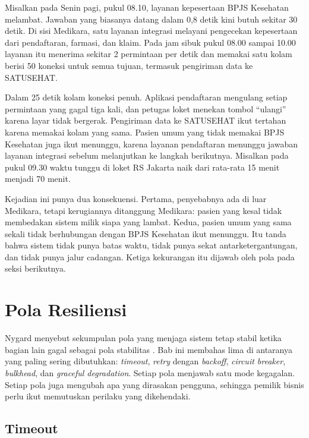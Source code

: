 \begin{kasus}[title={Kasus Medikara Health: Gangguan BPJS Kesehatan Merambat ke Loket}]
  Misalkan pada Senin pagi, pukul 08.10, layanan kepesertaan BPJS Kesehatan melambat. Jawaban yang
  biasanya datang dalam 0,8 detik kini butuh sekitar 30 detik. Di sisi Medikara, satu layanan
  integrasi melayani pengecekan kepesertaan dari pendaftaran, farmasi, dan klaim. Pada jam sibuk
  pukul 08.00 sampai 10.00 layanan itu menerima sekitar 2 permintaan per detik dan memakai satu
  kolam berisi 50 koneksi untuk semua tujuan, termasuk pengiriman data ke SATUSEHAT.

  Dalam 25 detik kolam koneksi penuh. Aplikasi pendaftaran mengulang setiap permintaan yang gagal
  tiga kali, dan petugas loket menekan tombol ``ulangi'' karena layar tidak bergerak. Pengiriman
  data ke SATUSEHAT ikut tertahan karena memakai kolam yang sama. Pasien umum yang tidak memakai BPJS
  Kesehatan juga ikut menunggu, karena layanan pendaftaran menunggu jawaban layanan integrasi
  sebelum melanjutkan ke langkah berikutnya. Misalkan pada pukul 09.30 waktu tunggu di loket RS
  Jakarta naik dari rata-rata 15 menit menjadi 70 menit.

  Kejadian ini punya dua konsekuensi. Pertama, penyebabnya ada di luar Medikara, tetapi kerugiannya
  ditanggung Medikara: pasien yang kesal tidak membedakan sistem milik siapa yang lambat. Kedua,
  pasien umum yang sama sekali tidak berhubungan dengan BPJS Kesehatan ikut menunggu. Itu tanda
  bahwa sistem tidak punya batas waktu, tidak punya sekat antarketergantungan, dan tidak punya jalur
  cadangan. Ketiga kekurangan itu dijawab oleh pola pada seksi berikutnya.
\end{kasus}

\section{Pola Resiliensi}
\label{sec:ch12-pola}

Nygard menyebut sekumpulan pola yang menjaga sistem tetap stabil ketika bagian lain gagal sebagai
pola stabilitas \cite{c12-nygard2018}. Bab ini membahas lima di antaranya yang paling sering
dibutuhkan: \textit{timeout}, \textit{retry} dengan \textit{backoff}, \textit{circuit breaker},
\textit{bulkhead}, dan \textit{graceful degradation}. Setiap pola menjawab satu mode kegagalan.
Setiap pola juga mengubah apa yang dirasakan pengguna, sehingga pemilik bisnis perlu ikut memutuskan
perilaku yang dikehendaki.

\subsection{Timeout}

